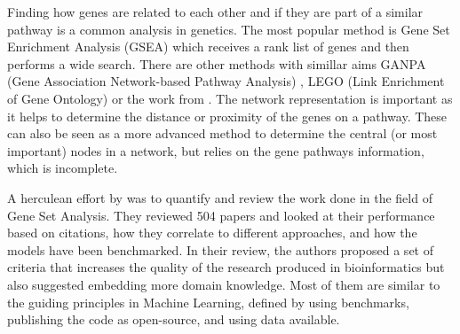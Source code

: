 Finding how genes are related to each other and if they are part of a similar pathway is a common analysis in genetics. The most popular method is Gene Set Enrichment Analysis (GSEA) which receives a rank list of genes and then performs a wide search. There are other methods with simillar aims GANPA (Gene Association Network-based Pathway Analysis) \cite{Fang2012-vr}, LEGO (Link Enrichment of Gene Ontology) \cite{Dong2016-zs} or the work from \citet{Cava2018-rv}. The network representation is important as it helps to determine the distance or proximity of the genes on a pathway. These can also be seen as a more advanced method to determine the central (or most important) nodes in a network, but relies on the gene pathways information, which is incomplete.

A herculean effort by \citet{Xie2021-al} was to quantify and review the work done in the field of Gene Set Analysis. They reviewed 504 papers and looked at their performance based on citations, how they correlate to different approaches, and how the models have been benchmarked. In their review, the authors proposed a set of criteria that increases the quality of the research produced in bioinformatics but also suggested embedding more domain knowledge. Most of them are similar to the guiding principles in Machine Learning, defined by using benchmarks, publishing the code as open-source, and using data available.



